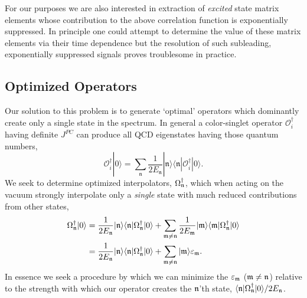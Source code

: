 For our purposes we are also interested in extraction of \emph{excited} state matrix elements whose contribution to the above correlation function is exponentially suppressed. In principle one could attempt to determine the value of these matrix elements via their time dependence but the resolution of such subleading, exponentially suppressed signals proves troublesome in practice.  


\subsection{Optimized Operators} \label{sec::OptOps}

Our solution to this problem is to generate `optimal' operators which dominantly create only a single state in the spectrum. In general a color-singlet operator $\mathcal{O}_i^\dag$ having definite $J^{PC}$ can produce all QCD eigenstates having those quantum numbers,
\begin{equation}
	\mathcal{O}_i^\dag |0\rangle = \sum_\mathfrak{n} \frac{1}{2E_{\mathfrak{n}}} |\mathfrak{n} \rangle \langle \mathfrak{n} | \mathcal{O}_i^\dag |0\rangle.  \nonumber
\end{equation}
We seek to determine optimized interpolators, $\Omega_{\mathfrak{n}}^\dagger$, which when acting on the vacuum strongly interpolate only a \emph{single} state with much reduced contributions from other states,
\begin{align*}
\Omega_{\mathfrak{n}}^\dagger | 0 \rangle &= \frac{1}{2E_{\mathfrak{n}}}|\mathfrak{n}\rangle \langle \mathfrak{n} | \Omega^\dagger_{\mathfrak{n}} | 0 \rangle + \sum_{\mathfrak{m} \neq \mathfrak{n}} \frac{1}{2E_{\mathfrak{m}}}  |\mathfrak{m}\rangle \langle \mathfrak{m} | \Omega^\dagger_{\mathfrak{n}} | 0 \rangle \\
&=\frac{1}{2E_{\mathfrak{n}}} |\mathfrak{n}\rangle \langle \mathfrak{n} | \Omega^\dagger_{\mathfrak{n}} | 0 \rangle + \sum_{\mathfrak{m} \neq \mathfrak{n}}  |\mathfrak{m}\rangle \varepsilon_{\mathfrak{m}}.
\end{align*}
In essence we seek a procedure by which we can minimize the $\varepsilon_{\mathfrak{m}}$ ($\mathfrak{m} \neq \mathfrak{n}$) relative to the strength with which our operator creates the $\mathfrak{n}$'th state, $\langle \mathfrak{n} | \Omega^\dagger_{\mathfrak{n}} | 0 \rangle/2E_{\mathfrak{n}}$. 

